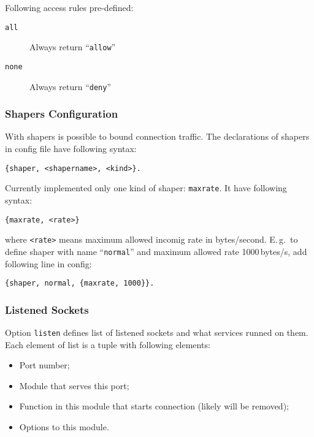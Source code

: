 \documentclass[10pt]{article}
\begin{document}
Following access rules pre-defined:
\begin{description}
\item[\texttt{all}] Always return ``\texttt{allow}''
\item[\texttt{none}] Always return ``\texttt{deny}''
\end{description}



\subsubsection{Shapers Configuration}
\label{sec:configshaper}

With shapers is possible to bound connection traffic.  The declarations of
shapers in config file have following syntax:
\begin{verbatim}
{shaper, <shapername>, <kind>}.
\end{verbatim}
Currently implemented only one kind of shaper: \texttt{maxrate}.  It have
following syntax:
\begin{verbatim}
{maxrate, <rate>}
\end{verbatim}
where \texttt{<rate>} means maximum allowed incomig rate in bytes/second.
E.\,g.\ to define shaper with name ``\texttt{normal}'' and maximum allowed rate
1000\,bytes/s, add following line in config:
\begin{verbatim}
{shaper, normal, {maxrate, 1000}}.
\end{verbatim}




\subsubsection{Listened Sockets}
\label{sec:configlistened}

Option \texttt{listen} defines list of listened sockets and what services
runned on them.  Each element of list is a tuple with following elements:
\begin{itemize}
\item Port number;
\item Module that serves this port;
\item Function in this module that starts connection (likely will be removed);
\item Options to this module.
\end{itemize}
\end{document}
